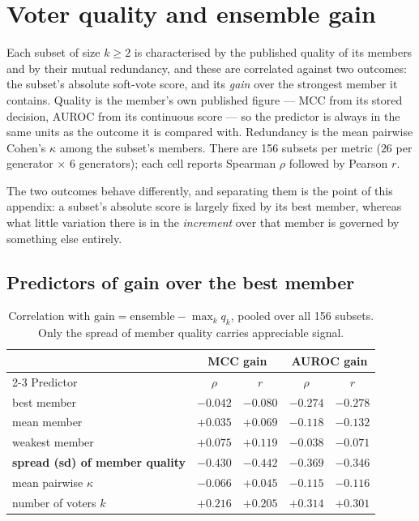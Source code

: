 \section{Voter quality and ensemble gain}
\label{sec:appendix:quality_gain}

Each subset of size $k \ge 2$ is characterised by the published quality of its members
and by their mutual redundancy, and these are correlated against two outcomes: the
subset's absolute soft-vote score, and its \emph{gain} over the strongest member it
contains. Quality is the member's own published figure --- MCC from its stored decision,
AUROC from its continuous score --- so the predictor is always in the same units as the
outcome it is compared with. Redundancy is the mean pairwise Cohen's $\kappa$ among the
subset's members. There are 156 subsets per metric ($26$ per generator $\times$ $6$
generators); each cell reports Spearman $\rho$ followed by Pearson $r$.

The two outcomes behave differently, and separating them is the point of this appendix: a
subset's absolute score is largely fixed by its best member, whereas what little variation
there is in the \emph{increment} over that member is governed by something else entirely.

\subsection{Predictors of gain over the best member}

\begin{table}[h]\centering\footnotesize
  \caption{Correlation with $\mathrm{gain} = \mathrm{ensemble} - \max_k q_k$, pooled
  over all 156 subsets. Only the spread of member quality carries appreciable signal.}
  \begin{tabular}{l c c c c}
    \hline
    & \multicolumn{2}{c}{MCC gain} & \multicolumn{2}{c}{AUROC gain} \\
    \cline{2-3}\cline{4-5}
    Predictor & $\rho$ & $r$ & $\rho$ & $r$ \\
    \hline
    best member & $-0.042$ & $-0.080$ & $-0.274$ & $-0.278$ \\
    mean member & $+0.035$ & $+0.069$ & $-0.118$ & $-0.132$ \\
    weakest member & $+0.075$ & $+0.119$ & $-0.038$ & $-0.071$ \\
    \textbf{spread (sd) of member quality} & $\mathbf{-0.430}$ & $\mathbf{-0.442}$ & $\mathbf{-0.369}$ & $\mathbf{-0.346}$ \\
    mean pairwise $\kappa$ & $-0.066$ & $+0.045$ & $-0.115$ & $-0.116$ \\
    number of voters $k$ & $+0.216$ & $+0.205$ & $+0.314$ & $+0.301$ \\
    \hline\end{tabular}\end{table}

